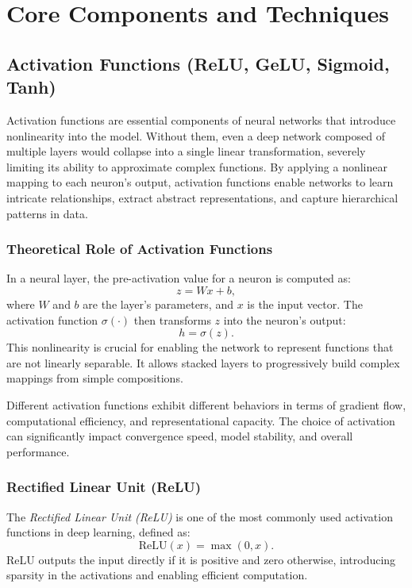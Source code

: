 \documentclass[12pt,a4paper]{report}
\begin{document}
\chapter{Core Components and Techniques}
\section{Activation Functions (ReLU, GeLU, Sigmoid, Tanh)}

Activation functions are essential components of neural networks that introduce nonlinearity into the model. 
Without them, even a deep network composed of multiple layers would collapse into a single linear transformation, 
severely limiting its ability to approximate complex functions.  
By applying a nonlinear mapping to each neuron’s output, activation functions enable networks to learn intricate relationships, 
extract abstract representations, and capture hierarchical patterns in data.

\vspace{1em}
\subsection{Theoretical Role of Activation Functions}

In a neural layer, the pre-activation value for a neuron is computed as:
\[
z = W x + b,
\]
where $W$ and $b$ are the layer’s parameters, and $x$ is the input vector.  
The activation function $\sigma(\cdot)$ then transforms $z$ into the neuron’s output:
\[
h = \sigma(z).
\]
This nonlinearity is crucial for enabling the network to represent functions that are not linearly separable.  
It allows stacked layers to progressively build complex mappings from simple compositions.

\vspace{0.5em}
Different activation functions exhibit different behaviors in terms of gradient flow, computational efficiency, and representational capacity.  
The choice of activation can significantly impact convergence speed, model stability, and overall performance.

\vspace{1em}
\subsection{Rectified Linear Unit (ReLU)}

The \textit{Rectified Linear Unit (ReLU)} is one of the most commonly used activation functions in deep learning, defined as:
\[
\text{ReLU}(x) = \max(0, x).
\]
ReLU outputs the input directly if it is positive and zero otherwise, introducing sparsity in the activations and enabling efficient computation.
\end{document}
